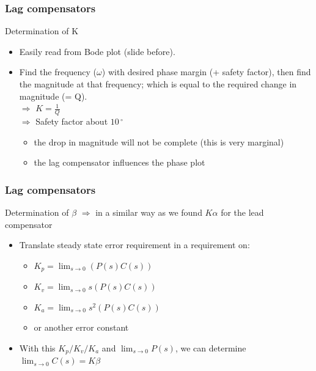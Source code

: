 \begin{frame}
	\frametitle{Lag compensators}
	\begin{block}{Determination of K}
	\begin{itemize}
		\item Easily read from Bode plot (slide before).
		\item Find the frequency ($\omega$) with desired phase margin (+ safety factor), then find the magnitude at that frequency; which is equal to the required change in magnitude (= Q). \\
		$\Rightarrow$ $K = \frac{1}{Q}$ \\
		$\Rightarrow$ Safety factor about $10\,^{\circ}$
		\begin{itemize}
			\item the drop in magnitude will not be complete (this is very marginal)
			\item the lag compensator influences the phase plot
		\end{itemize}
	\end{itemize}
	\end{block}
\end{frame}

\begin{frame}
	\frametitle{Lag compensators}
	\begin{block}{Determination of $\beta$}
	$\Rightarrow$ in a similar way as we found $K\alpha$ for the lead compensator
	\begin{itemize}
	\item Translate steady state error requirement in a requirement on:
	\begin{itemize}
		\item $K_p = \lim_{s \to 0} (P(s)C(s))$
		\item $K_v = \lim_{s \to 0} s(P(s)C(s))$
		\item $K_a = \lim_{s \to 0} s^2(P(s)C(s))$
		\item or another error constant
	\end{itemize}
	\item With this $K_p/K_v/K_a$ and $\lim_{s \to 0} P(s)$, we can determine $\lim_{s \to 0}C(s) = K\beta$
	\end{itemize}
	\end{block}
\end{frame}


